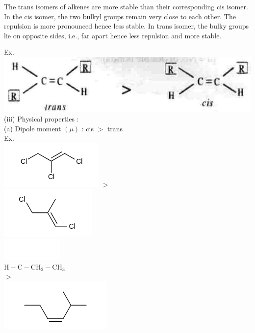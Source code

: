 \documentclass[10pt]{article}
\begin{document}
The trans isomers of alkenes are more stable than their corresponding cis isomer. In the cis isomer, the two bulkyl groups remain very close to each other. The repulsion is more pronounced hence less stable. In trans isomer, the bulky groups lie on opposite sides, i.e., far apart hence less repulsion and more stable.

Ex.\\
\includegraphics[max width=\textwidth, center]{2025_01_28_8470952b98110cec3aabg-047}\\
(iii) Physical properties :\\
(a) Dipole moment $(\mu)$ : cis $>$ trans\\
Ex.\\
\includegraphics{smile-6f9e4c04897309ffb2cea17593d0949fac85df87} $>$\\
\includegraphics{smile-03309392de7cb0babac575cf49c6ecd414d7d2c6}\\
\includegraphics{smile-8b9e6bc4a5491d1ed8216df0fde3728471175046}\\
$\mathrm{H}-\mathrm{C}-\mathrm{CH}_{2}-\mathrm{CH}_{3}$\\
$>$\\
\includegraphics{smile-9ef4efb90160915d397bb81317c0094f4d5b9a2a}
\end{document}
